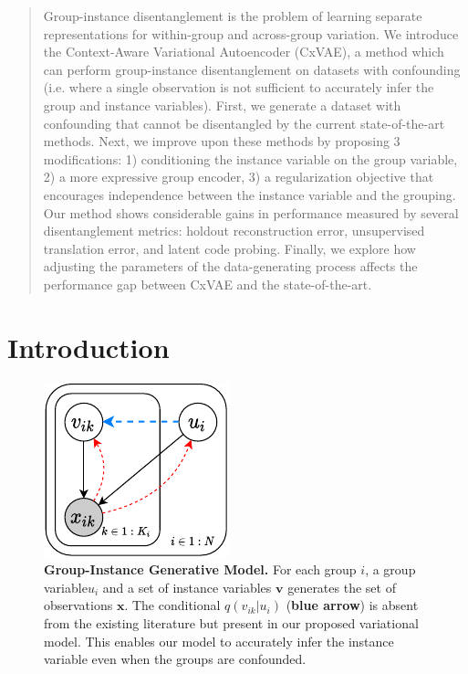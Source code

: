 \documentclass[nohyperref]{article}
\theoremstyle{plain}
\theoremstyle{definition}
\theoremstyle{remark}
\begin{document}
\begin{abstract}
Group-instance disentanglement is the problem of learning separate representations for within-group and across-group variation. We introduce the Context-Aware Variational Autoencoder (CxVAE), a method which can perform group-instance disentanglement on datasets with confounding (i.e. where a single observation is not sufficient to accurately infer the group and instance variables). First, we generate a dataset with confounding that cannot be disentangled by the current state-of-the-art methods. Next, we improve upon these methods by proposing 3 modifications: 1) conditioning the instance variable on the group variable, 2) a more expressive group encoder, 3) a regularization objective that encourages independence between the instance variable and the grouping. Our method shows considerable gains in performance measured by several disentanglement metrics: holdout reconstruction error, unsupervised translation error, and latent code probing. Finally, we explore how adjusting the parameters of the data-generating process affects the performance gap between CxVAE and the state-of-the-art.
\end{abstract}

\section{Introduction}
\label{intro}

\begin{figure}[t]
    \vskip 0.2in
    \begin{center}
    \centerline{\includegraphics[width=0.7\columnwidth]{files/bayes_net_one.pdf}}
    \caption{\textbf{Group-Instance Generative Model.} For each group $i$, a group variable$u_i$ and a set of instance variables $\mathbf{v}$ generates the set of observations $\mathbf{x}$. The conditional $q(v_{ik} | u_i)$ (\textbf{blue arrow}) is absent from the existing literature but present in our proposed variational model. This enables our model to accurately infer the instance variable even when the groups are confounded. }
    \label{fig:pgm}
    \end{center}
    \vskip -0.2in
\end{figure}
\end{document}
